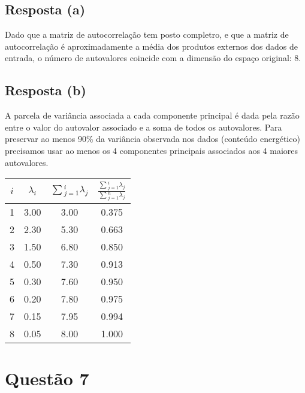 \documentclass[final,3p]{elsarticle}
\numberwithin{equation}{section}
\begin{document}
    \subsection{Resposta \textbf{(a)}}

        Dado que a matriz de autocorrelação tem posto completro, e que a matriz de autocorrelação é aproximadamente a média dos produtos externos dos dados de entrada, o número de autovalores coincide com a dimensão do espaço original: 8.

    \subsection{Resposta \textbf{(b)}}

        A parcela de variância associada a cada componente principal é dada pela razão entre o valor do autovalor associado e a soma de todos os autovalores. Para preservar ao menos 90\% da variância observada nos dados (conteúdo energético) precisamos usar ao menos os 4 componentes principais associados aos 4 maiores autovalores.

        \begin{table}[h]
            \centering
            \begin{tabular}{c c c c}
                \toprule
                \textbf{$i$} & \textbf{$\lambda{}_i$} & \textbf{$\sum{}_{j=1}^i\lambda{}_j$} & \textbf{$\frac{\sum{}_{j=1}^i\lambda{}_j}{\sum{}_{j=1}^n\lambda{}_j}$} \\
                \midrule
                1 & 3.00 & 3.00 & 0.375 \\
                2 & 2.30 & 5.30 & 0.663 \\
                3 & 1.50 & 6.80 & 0.850 \\
                4 & 0.50 & 7.30 & 0.913 \\
                5 & 0.30 & 7.60 & 0.950 \\
                6 & 0.20 & 7.80 & 0.975 \\
                7 & 0.15 & 7.95 & 0.994 \\
                8 & 0.05 & 8.00 & 1.000 \\
                \bottomrule
            \end{tabular}
        \end{table}


\section{Questão 7}
\end{document}
